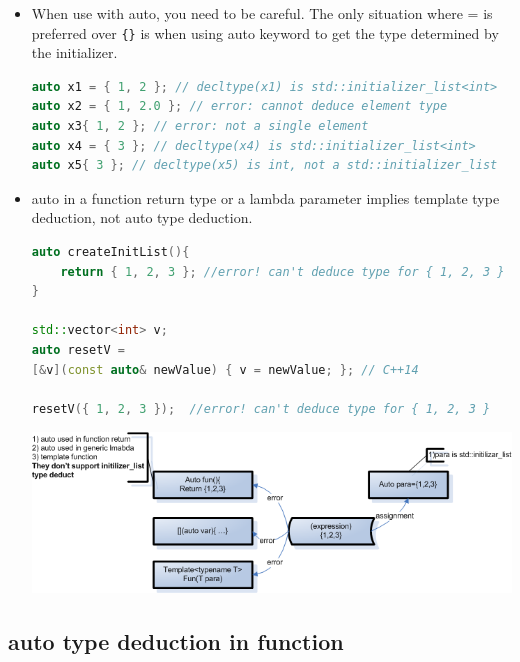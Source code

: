 \documentclass[a4paper,11pt,twoside]{book}
\begin{document}
\begin{itemize}
	\item When use with auto, you need to be careful. The only situation where = is preferred over \verb={}= is when using auto keyword to get the type determined by the initializer.
\begin{lstlisting}[frame=single, language=c++]
auto x1 = { 1, 2 }; // decltype(x1) is std::initializer_list<int>
auto x2 = { 1, 2.0 }; // error: cannot deduce element type
auto x3{ 1, 2 }; // error: not a single element
auto x4 = { 3 }; // decltype(x4) is std::initializer_list<int>
auto x5{ 3 }; // decltype(x5) is int, not a std::initializer_list
\end{lstlisting}

	\item auto in a function return type or a lambda parameter implies template type deduction, not auto type deduction.
\begin{lstlisting}[frame=single, language=c++]
auto createInitList(){
	return { 1, 2, 3 }; //error! can't deduce type for { 1, 2, 3 }
}
	
std::vector<int> v;
auto resetV =
[&v](const auto& newValue) { v = newValue; }; // C++14
	
resetV({ 1, 2, 3 });  //error! can't deduce type for { 1, 2, 3 }
\end{lstlisting}

	\begin{center}
        \includegraphics[scale=0.6]{pics/autotype.png}
    \end{center}

	


\end{itemize}

\subsection{auto type deduction in function}
\end{document}
